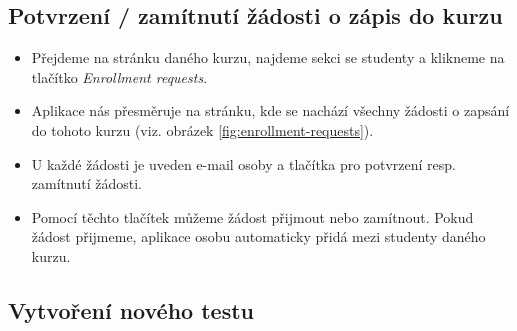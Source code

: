 \subsection{Potvrzení / zamítnutí žádosti o zápis do kurzu}
\begin{itemize}
	\item Přejdeme na stránku daného kurzu, najdeme sekci se studenty a klikneme na tlačítko \textit{Enrollment requests}.
	\item Aplikace nás přesměruje na stránku, kde se nachází všechny žádosti o zapsání do tohoto kurzu (viz. obrázek \ref{fig:enrollment-requests}).
	\item U každé žádosti je uveden e-mail osoby a tlačítka pro potvrzení resp. zamítnutí žádosti.
	\item Pomocí těchto tlačítek můžeme žádost přijmout nebo zamítnout. Pokud žádost přijmeme, aplikace osobu automaticky přidá mezi studenty daného kurzu.
\end{itemize}

\subsection{Vytvoření nového testu}

